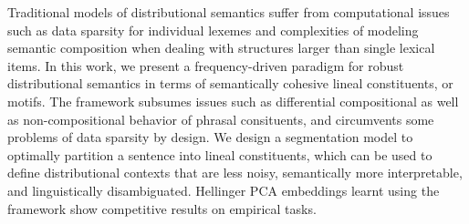Traditional models of distributional semantics suffer from computational issues such as data sparsity for individual lexemes and complexities of modeling semantic composition when dealing with structures larger than single lexical items. In this work, we present a frequency-driven paradigm for robust distributional semantics in terms of semantically cohesive lineal constituents, or motifs. The framework subsumes issues such as differential compositional as well as non-compositional behavior of phrasal consituents, and circumvents some problems of data sparsity by design. We design a segmentation model to optimally partition a sentence into lineal constituents, which can be used to define distributional contexts that are less noisy, semantically more interpretable, and linguistically disambiguated. Hellinger PCA embeddings learnt using the framework show competitive results on empirical tasks.
